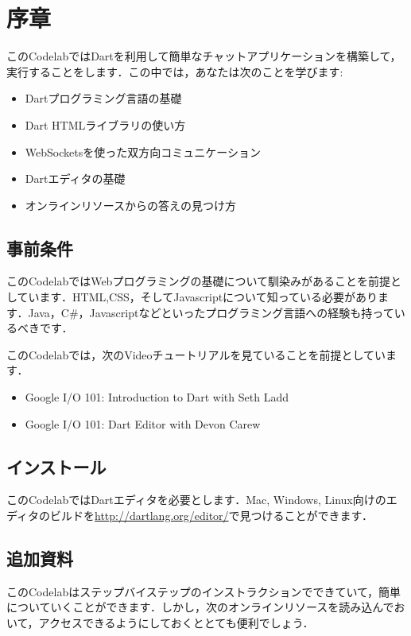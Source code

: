 \section{序章}

このCodelabではDartを利用して簡単なチャットアプリケーションを構築して，実行することをします．この中では，あなたは次のことを学びます:

\begin{itemize}
\item Dartプログラミング言語の基礎
\item Dart HTMLライブラリの使い方
\item WebSocketsを使った双方向コミュニケーション
\item Dartエディタの基礎
\item オンラインリソースからの答えの見つけ方
\end{itemize}

\subsection{事前条件}

このCodelabではWebプログラミングの基礎について馴染みがあることを前提としています．HTML,CSS，そしてJavascriptについて知っている必要があります．Java，C\#，Javascriptなどといったプログラミング言語への経験も持っているべきです．

このCodelabでは，次のVideoチュートリアルを見ていることを前提としています．

\begin{itemize}
\item Google I/O 101: Introduction to Dart with Seth Ladd
\item Google I/O 101: Dart Editor with Devon Carew
\end{itemize}

\subsection{インストール}

このCodelabではDartエディタを必要とします．Mac, Windows, Linux向けのエディタのビルドを\url{http://dartlang.org/editor/}で見つけることができます．

\subsection{追加資料}

このCodelabはステップバイステップのインストラクションでできていて，簡単についていくことができます．しかし，次のオンラインリソースを読み込んでおいて，アクセスできるようにしておくととても便利でしょう．

